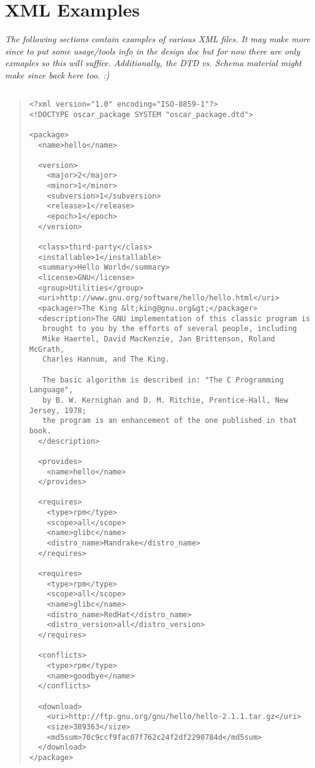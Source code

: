 %
%
%

\section{XML Examples}
\label{append:xml-overview}
\emph{The following sections contain examples of various XML files.  
It may make more since to put some usage/tools info in the design doc 
but for now there are only exmaples so this will suffice.
Additionally, the DTD vs. Schema material might make since back here
too.  :)}

\subsection{}
\begin{quote}
 \begin{small}
 \begin{verbatim}
<?xml version="1.0" encoding="ISO-8859-1"?>
<!DOCTYPE oscar_package SYSTEM "oscar_package.dtd">

<package>
  <name>hello</name>

  <version>
    <major>2</major>
    <minor>1</minor>
    <subversion>1</subversion>
    <release>1</release>
    <epoch>1</epoch>
  </version>

  <class>third-party</class>
  <installable>1</installable>
  <summary>Hello World</summary>
  <license>GNU</license>
  <group>Utilities</group>
  <uri>http://www.gnu.org/software/hello/hello.html</uri>
  <packager>The King &lt;king@gnu.org&gt;</packager>
  <description>The GNU implementation of this classic program is
   brought to you by the efforts of several people, including 
   Mike Haertel, David MacKenzie, Jan Brittenson, Roland McGrath, 
   Charles Hannum, and The King.

   The basic algorithm is described in: "The C Programming Language", 
   by B. W. Kernighan and D. M. Ritchie, Prentice-Hall, New Jersey, 1978;
   the program is an enhancement of the one published in that book.  
  </description>

  <provides>
    <name>hello</name>
  </provides>

  <requires>
    <type>rpm</type>
    <scope>all</scope>
    <name>glibc</name>
    <distro_name>Mandrake</distro_name>
  </requires>

  <requires>
    <type>rpm</type>
    <scope>all</scope>
    <name>glibc</name>
    <distro_name>RedHat</distro_name>
    <distro_version>all</distro_version>
  </requires>

  <conflicts>
    <type>rpm</type>
    <name>goodbye</name>
  </conflicts>

  <download>
    <uri>http://ftp.gnu.org/gnu/hello/hello-2.1.1.tar.gz</uri>
    <size>389363</size>
    <md5sum>70c9ccf9fac07f762c24f2df2290784d</md5sum>
  </download>
</package>
 \end{verbatim}
 \end{small}
\end{quote}

